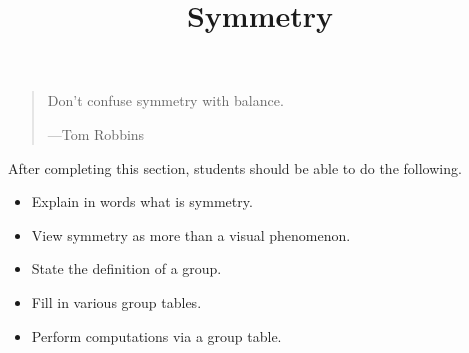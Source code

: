 \documentclass{ximera}
\title{Symmetry}
\begin{document}
\begin{abstract}
\end{abstract}
\maketitle

\begin{quote}
  Don't confuse symmetry with balance.


  \hfill ---Tom Robbins%
\end{quote}
After completing this section, students should be able to do the following.

\begin{itemize}
\item Explain in words what is symmetry.
\item View symmetry as more than a visual phenomenon.
\item State the definition of a group.
\item Fill in various group tables.
\item Perform computations via a group table.
\end{itemize}
\end{document}
